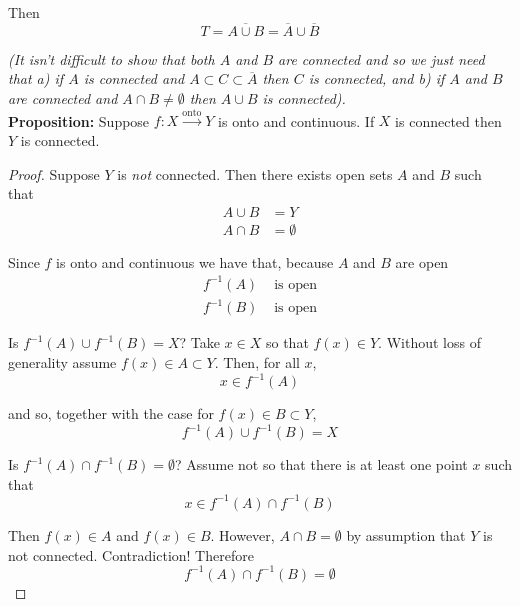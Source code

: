 \documentclass[12pt]{article}
\newlength\tindent
\renewcommand{\indent}{\hspace*{\tindent}}
\begin{document}
Then
\begin{equation*}
	T = \overline{A \cup B} = \overline{A} \cup \overline{B}
\end{equation*}

{\em (It isn't difficult to show that both $A$ and $B$ are connected and so we just need that a) if $A$ is connected and $A \subset C \subset \overline{A}$ then $C$ is connected, and b) if $A$ and $B$ are connected and $A \cap B \neq \emptyset$ then $A \cup B$ is connected).} \\

%
%
{\bf Proposition:} Suppose $f:X\stackrel{\text{onto}}{\to}Y$ is onto and continuous. If $X$ is connected then $Y$ is connected.

\begin{proof} Suppose $Y$ is {\em not} connected. Then there exists open sets $A$ and $B$ such that
\begin{align*}
	A \cup B &= Y \\
	A \cap B &= \emptyset
\end{align*}

Since $f$ is onto and continuous we have that, because $A$ and $B$ are open
\begin{align*}
	f^{-1}(A) &\text{ is open} \\
	f^{-1}(B) &\text{ is open}	
\end{align*}

Is $f^{-1}(A) \cup f^{-1}(B) = X$? Take $x \in X$ so that $f(x) \in Y$. Without loss of generality assume $f(x) \in A \subset Y$. Then, for all $x$,
\begin{equation*}
	x \in f^{-1}(A)
\end{equation*}

and so, together with the case for $f(x) \in B \subset Y$,
\begin{equation*}
	f^{-1}(A) \cup f^{-1}(B) = X
\end{equation*}

Is $f^{-1}(A) \cap f^{-1}(B) = \emptyset$? Assume not so that there is at least one point $x$ such that
\begin{equation*}
	x \in f^{-1}(A) \cap f^{-1}(B)
\end{equation*}

\indent Then $f(x) \in A$ and $f(x) \in B$. However, $A \cap B = \emptyset$ by assumption that $Y$ is not connected. Contradiction! Therefore
\begin{equation*}
	f^{-1}(A) \cap f^{-1}(B) = \emptyset
\end{equation*}


\end{proof}
\end{document}
